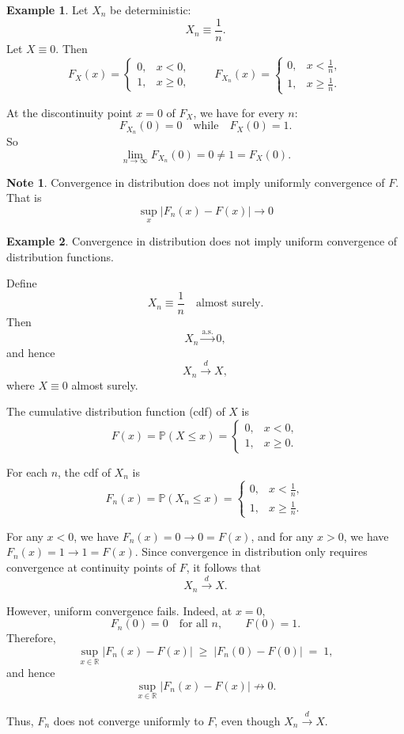 \documentclass[11pt]{article}
\theoremstyle{definition}
\newtheorem{note}{Note}[section]
\newtheorem{exmp}{Example}[section]
\begin{document}
\begin{exmp}
Let $X_n$ be deterministic:
\[
X_n \equiv \frac{1}{n}.
\]
Let $X \equiv 0$. Then
\[
F_X(x)=
\begin{cases}
0, & x<0,\\
1, & x\ge 0,
\end{cases}
\qquad
F_{X_n}(x)=
\begin{cases}
0, & x<\frac{1}{n},\\
1, & x\ge \frac{1}{n}.
\end{cases}
\]

At the discontinuity point $x=0$ of $F_X$, we have for every $n$:
\[
F_{X_n}(0)=0 \quad\text{while}\quad F_X(0)=1.
\]
So
\[
\lim_{n\to\infty} F_{X_n}(0)=0\neq 1=F_X(0).
\]
\end{exmp}
\begin{note}
    Convergence in distribution does not imply uniformly convergence of $F$. That is
    $$
    \sup_{x}|F_n(x)-F(x)|\rightarrow 0
    $$
\end{note}
\begin{exmp}
Convergence in distribution does not imply uniform convergence of distribution
functions.

Define
\[
X_n \equiv \frac{1}{n} \quad \text{almost surely}.
\]
Then
\[
X_n \xrightarrow{\text{a.s.}} 0,
\]
and hence
\[
X_n \xrightarrow{d} X,
\]
where \(X \equiv 0\) almost surely.

The cumulative distribution function (cdf) of \(X\) is
\[
F(x) = \mathbb{P}(X \le x) =
\begin{cases}
0, & x < 0, \\
1, & x \ge 0.
\end{cases}
\]

For each \(n\), the cdf of \(X_n\) is
\[
F_n(x) = \mathbb{P}(X_n \le x) =
\begin{cases}
0, & x < \frac{1}{n}, \\
1, & x \ge \frac{1}{n}.
\end{cases}
\]

For any \(x < 0\), we have \(F_n(x) = 0 \to 0 = F(x)\), and for any \(x > 0\),
we have \(F_n(x) = 1 \to 1 = F(x)\). Since convergence in distribution only
requires convergence at continuity points of \(F\), it follows that
\[
X_n \xrightarrow{d} X.
\]

However, uniform convergence fails. Indeed, at \(x = 0\),
\[
F_n(0) = 0 \quad \text{for all } n, \qquad F(0) = 1.
\]
Therefore,
\[
\sup_{x \in \mathbb{R}} |F_n(x) - F(x)|
\;\ge\;
|F_n(0) - F(0)|
\;=\;
1,
\]
and hence
\[
\sup_{x \in \mathbb{R}} |F_n(x) - F(x)| \not\to 0.
\]

Thus, \(F_n\) does not converge uniformly to \(F\), even though
\(X_n \xrightarrow{d} X\).

\end{exmp}
\end{document}

